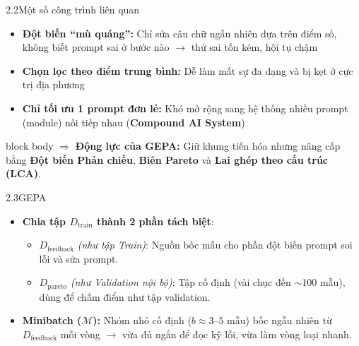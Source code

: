 \begin{frame}{2.2\quad Một số công trình liên quan}
  \vspace{0.3em}
  \begin{itemize}\setlength{\itemsep}{0.65em}
    \item \textbf{Đột biến ``mù quáng'':} Chỉ sửa câu chữ ngẫu nhiên dựa trên điểm số, không
          biết prompt sai ở bước nào $\rightarrow$ thử sai tốn kém, hội tụ chậm
    \item \textbf{Chọn lọc theo điểm trung bình:} Dễ làm mất sự đa dạng và bị kẹt ở cực trị
          địa phương
    \item \textbf{Chỉ tối ưu 1 prompt đơn lẻ:} Khó mở rộng sang hệ thống nhiều prompt (module)
          nối tiếp nhau (\textbf{Compound AI System})
  \end{itemize}
  \vspace{0.4em}
  \begin{beamercolorbox}[wd=\linewidth,sep=0.55em]{block body}
    $\Rightarrow$ \textbf{Động lực của GEPA:} Giữ khung tiến hóa nhưng nâng cấp bằng
    \textbf{Đột biến Phản chiếu}, \textbf{Biên Pareto} và \textbf{Lai ghép theo cấu trúc (LCA)}.
  \end{beamercolorbox}
\end{frame}

\begin{frame}{2.3\quad GEPA}
  \begin{itemize}\setlength{\itemsep}{0.45em}
    \item \textbf{Chia tập $D_{\text{train}}$ thành 2 phần tách biệt}:
      \begin{itemize}\tightlist
        \item $D_{\text{feedback}}$ \textit{(như tập Train)}: Nguồn bốc mẫu cho phần đột biến
              prompt soi lỗi và sửa prompt.
        \item $D_{\text{pareto}}$ \textit{(như Validation nội bộ)}: Tập cố định (vài chục đến
              $\sim$100 mẫu), dùng để chấm điểm như tập validation.
      \end{itemize}
    \item \textbf{Minibatch ($\mathcal{M}$):} Nhóm nhỏ cố định ($b \approx 3$--$5$ mẫu) bốc ngẫu
          nhiên từ $D_{\text{feedback}}$ mỗi vòng $\rightarrow$ vừa đủ ngắn để đọc kỹ lỗi,
          vừa làm vòng loại nhanh.
  \end{itemize}
\end{frame}

